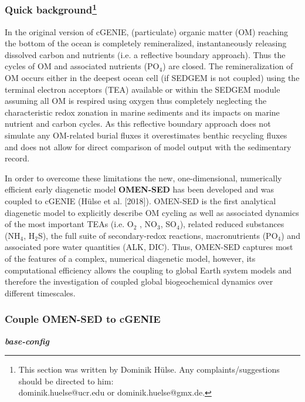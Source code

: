 \documentclass[11pt,fleqn]{book} %
\begin{document}
%
\subsubsection*{Quick background\footnote{This section was written by Dominik H\"ulse. Any complaints/suggestions should be directed to him:\\ dominik.huelse@ucr.edu or dominik.huelse@gmx.de.}}

In the original version of cGENIE, (particulate) organic matter (OM) reaching the bottom of the ocean is completely remineralized, instantaneously releasing dissolved carbon and nutrients (i.e. a reflective boundary approach). 
Thus the cycles of OM and associated nutrients (PO$_4$) are closed. The remineralization of OM occurs either in the deepest ocean cell (if SEDGEM is not coupled) using the terminal electron acceptors (TEA) available or within the SEDGEM 
module assuming all OM is respired using oxygen thus completely neglecting the characteristic redox zonation in marine sediments and its impacts on marine nutrient and carbon cycles. 
As this reflective boundary approach does not simulate any OM-related burial fluxes it overestimates benthic recycling fluxes and does not allow for direct comparison of model output with the sedimentary record. 

In order to overcome these limitations the new, one-dimensional, numerically efficient early diagenetic model \textbf{OMEN-SED} has been developed and was coupled to cGENIE (H\"ulse et al. [2018]). 
OMEN-SED is the first analytical diagenetic model to explicitly describe OM cycling as well as associated dynamics of the most important TEAs (i.e. O$_2$ , NO$_3$, SO$_4$), related reduced substances (NH$_4$, H$_2$S), the full suite of 
secondary-redox reactions, macronutrients (PO$_4$) and associated pore water quantities (ALK, DIC). Thus, OMEN-SED captures most of the features of a complex, numerical diagenetic model, however, its computational efficiency allows the 
coupling to global Earth system models and therefore the investigation of coupled global biogeochemical dynamics over different timescales.

%
\subsubsection*{Couple OMEN-SED to cGENIE}

\textbf{\textit{base-config}}
\vspace{1mm}
\end{document}
